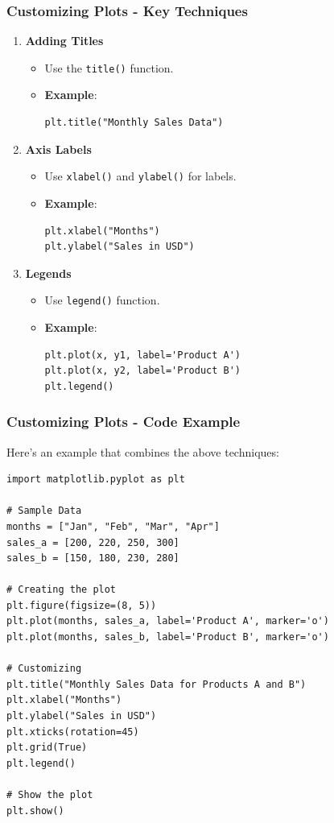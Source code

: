 \documentclass{beamer}
\begin{document}
\begin{frame}[fragile]
    \frametitle{Customizing Plots - Key Techniques}
    \begin{enumerate}
        \item \textbf{Adding Titles}
        \begin{itemize}
            \item Use the \texttt{title()} function.
            \item \textbf{Example}: 
            \begin{lstlisting}
plt.title("Monthly Sales Data")
            \end{lstlisting}
        \end{itemize}
        
        \item \textbf{Axis Labels}
        \begin{itemize}
            \item Use \texttt{xlabel()} and \texttt{ylabel()} for labels.
            \item \textbf{Example}: 
            \begin{lstlisting}
plt.xlabel("Months")
plt.ylabel("Sales in USD")
            \end{lstlisting}
        \end{itemize}
        
        \item \textbf{Legends}
        \begin{itemize}
            \item Use \texttt{legend()} function.
            \item \textbf{Example}: 
            \begin{lstlisting}
plt.plot(x, y1, label='Product A')
plt.plot(x, y2, label='Product B')
plt.legend()
            \end{lstlisting}
        \end{itemize}
    \end{enumerate}
\end{frame}

\begin{frame}[fragile]
    \frametitle{Customizing Plots - Code Example}
    Here’s an example that combines the above techniques:

    \begin{lstlisting}
import matplotlib.pyplot as plt

# Sample Data
months = ["Jan", "Feb", "Mar", "Apr"]
sales_a = [200, 220, 250, 300]
sales_b = [150, 180, 230, 280]

# Creating the plot
plt.figure(figsize=(8, 5))
plt.plot(months, sales_a, label='Product A', marker='o')
plt.plot(months, sales_b, label='Product B', marker='o')

# Customizing
plt.title("Monthly Sales Data for Products A and B")
plt.xlabel("Months")
plt.ylabel("Sales in USD")
plt.xticks(rotation=45)
plt.grid(True)
plt.legend()

# Show the plot
plt.show()
    \end{lstlisting}
\end{frame}
\end{document}
